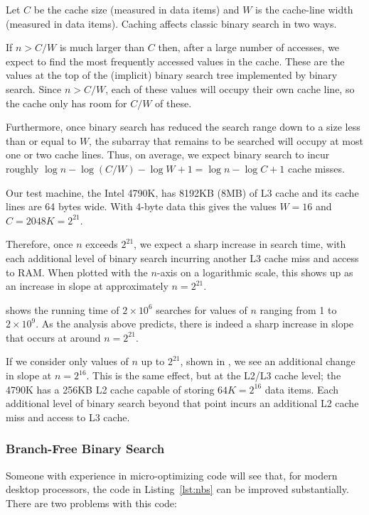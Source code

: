\documentclass{patmorin}
\newcommand{\lstref}[1]{Listing~\ref{lst:#1}}
\begin{document}
Let $C$ be the cache size (measured in data items) and $W$ is the
cache-line width (measured in data items).  Caching affects classic
binary search in two ways.

If $n> C/W$ is much larger than $C$ then, after a large number of
accesses, we expect to find the most frequently accessed values in the
cache.  These are the values at the top of the (implicit) binary search
tree implemented by binary search.  Since $n>C/W$, each of these values
will occupy their own cache line, so the cache only has room for $C/W$
of these.

Furthermore, once binary search has reduced the search range down to a
size less than or equal to $W$, the subarray that remains to be searched
will occupy at most one or two cache lines. Thus, on average, we expect
binary search to incur roughly $\log n -\log(C/W) - \log W + 1 = \log n -
\log C + 1$ cache misses.

Our test machine, the Intel 4790K, has 8192KB (8MB) of L3 cache and its
cache lines are 64 bytes wide.  With 4-byte data this gives the values
$W=16$ and $C=2048K=2^{21}$.  

Therefore, once $n$ exceeds $2^{21}$, we expect a sharp increase in
search time, with each additional level of binary search incurring
another L3 cache miss and access to RAM.  When plotted with the
$n$-axis on a logarithmic scale, this shows up as an increase in slope
at approximately $n=2^{21}$.

 shows the running time of $2\times 10^6$
searches for values of $n$ ranging from 1 to $2\times 10^9$.  As the
analysis above predicts, there is indeed a sharp increase in slope that
occurs at around $n=2^{21}$. 

If we consider only values of $n$ up to $2^{21}$, shown in
, we see an additional change in slope at
$n=2^{16}$.  This is the same effect, but at the L2/L3 cache level; the
4790K has a 256KB L2 cache capable of storing $64K=2^{16}$ data items.
Each additional level of binary search beyond that point incurs an
additional L2 cache miss and access to L3 cache.


\subsubsection{Branch-Free Binary Search}

Someone with experience in micro-optimizing code will see that, for
modern desktop processors, the code in \lstref{nbs} can be improved
substantially.  There are two problems with this code:
\end{document}
